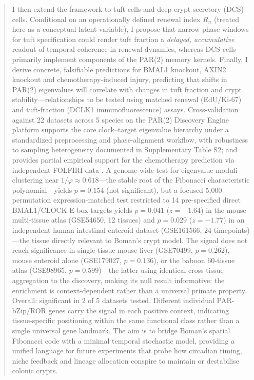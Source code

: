 \documentclass[11pt,letterpaper]{article}
\theoremstyle{definition}
\theoremstyle{remark}
\begin{document}
\begin{abstract}
I then extend the framework to tuft cells and deep crypt secretory (DCS) cells. Conditional on an operationally defined renewal index $R_n$ (treated here as a conceptual latent variable), I propose that narrow phase windows for tuft specification could render tuft fraction a \textit{delayed, accumulative} readout of temporal coherence in renewal dynamics, whereas DCS cells primarily implement components of the PAR(2) memory kernels. Finally, I derive concrete, falsifiable predictions for BMAL1 knockout, AXIN2 knockout and chemotherapy-induced injury, predicting that shifts in PAR(2) eigenvalues will correlate with changes in tuft fraction and crypt stability---relationships to be tested using matched renewal (EdU/Ki-67) and tuft-fraction (DCLK1 immunofluorescence) assays. Cross-validation against 22 datasets across 5 species on the PAR(2) Discovery Engine platform supports the core clock--target eigenvalue hierarchy under a standardized preprocessing and phase-alignment workflow, with robustness to sampling heterogeneity documented in Supplementary Table S2; and provides partial empirical support for the chemotherapy prediction via independent FOLFIRI data \citep{nguyen2025colonic, mzoughi2025chemotherapy}. A genome-wide test for eigenvalue moduli clustering near $1/\varphi \approx 0.618$---the stable root of the Fibonacci characteristic polynomial---yields $p = 0.154$ (not significant), but a focused 5{,}000-permutation expression-matched test restricted to 14 pre-specified direct BMAL1/CLOCK E-box targets yields $p = 0.041$ ($z = -1.64$) in the mouse multi-tissue atlas (GSE54650, 12 tissues) and $p = 0.029$ ($z = -1.77$) in an independent human intestinal enteroid dataset (GSE161566, 24 timepoints)---the tissue directly relevant to Boman's crypt model. The signal does not reach significance in single-tissue mouse liver (GSE70499, $p = 0.262$), mouse enteroid alone (GSE179027, $p = 0.136$), or the baboon 60-tissue atlas (GSE98965, $p = 0.599$)---the latter using identical cross-tissue aggregation to the discovery, making its null result informative: the enrichment is context-dependent rather than a universal primate property. Overall: significant in 2 of 5 datasets tested. Different individual PAR-bZip/ROR genes carry the signal in each positive context, indicating tissue-specific positioning within the same functional class rather than a single universal gene landmark. The aim is to bridge Boman's spatial Fibonacci code with a minimal temporal stochastic model, providing a unified language for future experiments that probe how circadian timing, niche feedback and lineage allocation conspire to maintain or destabilise colonic crypts.
\end{abstract}
\end{document}
